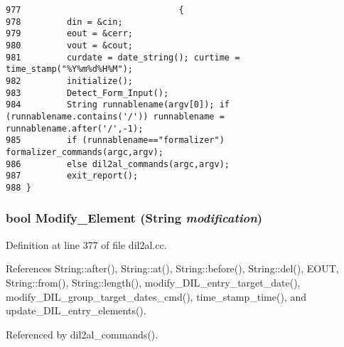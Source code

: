 \footnotesize\begin{verbatim}977                               {
978         din = &cin;
979         eout = &cerr;
980         vout = &cout;
981         curdate = date_string(); curtime = time_stamp("%Y%m%d%H%M");
982         initialize();
983         Detect_Form_Input();
984         String runnablename(argv[0]); if (runnablename.contains('/')) runnablename = runnablename.after('/',-1);
985         if (runnablename=="formalizer") formalizer_commands(argc,argv);
986         else dil2al_commands(argc,argv);
987         exit_report();
988 }
\end{verbatim}\normalsize 
{}
\subsubsection{\setlength{\rightskip}{0pt plus 5cm}bool Modify\_\-Element ({\bf String} {\em modification})}\label{dil2al_8cc_a104}




Definition at line 377 of file dil2al.cc.

References String::after(), String::at(), String::before(), String::del(), EOUT, String::from(), String::length(), modify\_\-DIL\_\-entry\_\-target\_\-date(), modify\_\-DIL\_\-group\_\-target\_\-dates\_\-cmd(), time\_\-stamp\_\-time(), and update\_\-DIL\_\-entry\_\-elements().

Referenced by dil2al\_\-commands().



